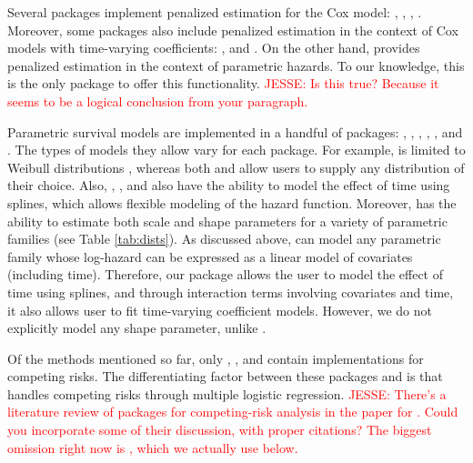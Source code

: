 \documentclass[
]{jss}
\begin{document}
Several packages implement penalized estimation for the Cox model:
 \citeyearpar{regpathcox}, 
\citeyearpar{park_hastie},  \citeyearpar{l1penal},
 \citeyearpar{gerds_blanche}. Moreover, some
packages also include penalized estimation in the context of Cox models
with time-varying coefficients: 
\citeyearpar{perperoglou},  \citeyearpar{clements_liu} and
 \citeyearpar{survival-package}. On the other hand,
 provides penalized estimation in the context of
parametric hazards. To our knowledge, this is the only package to offer
this functionality.
\textcolor{red}{JESSE: Is this true? Because it seems to be a logical conclusion from your paragraph.}

Parametric survival models are implemented in a handful of packages:
 \citeyearpar{sharabiani_mahani_2019}, 
\citeyearpar{flexsurv},  \citeyearpar{smoothHazard},
 \citeyearpar{clements_liu}, 
\citeyearpar{scheike2014estimating}, and . The types of
models they allow vary for each package. For example, 
is limited to Weibull distributions \citeyearpar{smoothHazard}, whereas
both  and  allow users to supply any
distribution of their choice. Also, , ,
 and  also have the ability to model the effect of
time using splines, which allows flexible modeling of the hazard
function. Moreover,  has the ability to estimate both
scale and shape parameters for a variety of parametric families (see
Table \ref{tab:dists}). As discussed above,  can model any
parametric family whose log-hazard can be expressed as a linear model of
covariates (including time). Therefore, our package allows the user to
model the effect of time using splines, and through interaction terms
involving covariates and time, it also allows user to fit time-varying
coefficient models. However, we do not explicitly model any shape
parameter, unlike .

Of the methods mentioned so far, only , ,
 and  contain implementations for competing
risks. The differentiating factor between these packages and
 is that  handles competing risks through
multiple logistic regression.
\textcolor{red}{JESSE: There's a literature review of packages for competing-risk analysis in the paper for . Could you incorporate some of their discussion, with proper citations? The biggest omission right now is , which we actually use below.}
\end{document}
